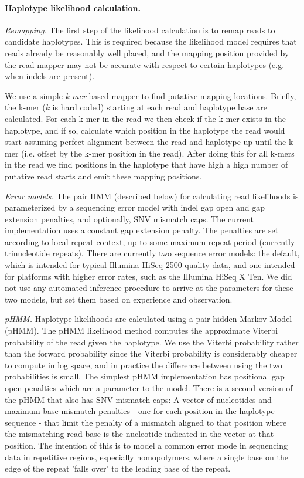 \documentclass[notitlepage, twocolumn, 10pt]{article}
\begin{document}
\paragraph*{Haplotype likelihood calculation.} \emph{Remapping.} The first step of the likelihood calculation is to remap reads to candidate haplotypes. This is required because the likelihood model requires that reads already be reasonably well placed, and the mapping position provided by the read mapper may not be accurate with respect to certain haplotypes (e.g. when indels are present).

We use a simple \emph{k-mer} based mapper to find putative mapping locations. Briefly, the k-mer ($k$ is hard coded) starting at each read and haplotype base are calculated. For each k-mer in the read we then check if the k-mer exists in the haplotype, and if so, calculate which position in the haplotype the read would start assuming perfect alignment between the read and haplotype up until the k-mer (i.e. offset by the k-mer position in the read). After doing this for all k-mers in the read we find positions in the haplotype that have high a high number of putative read starts and emit these mapping positions.

\vspace{3mm}
\noindent\emph{Error models.} The pair HMM (described below) for calculating
read likelihoods is parameterized by a sequencing error model with indel gap open and gap extension penalties, and optionally, SNV mismatch caps. The current implementation uses a constant gap extension penalty. The penalties are set according to local repeat context, up to some maximum repeat period (currently trinucleotide repeats). There are currently two sequence error models: the default, which is intended for typical Illumina HiSeq 2500 quality data, and one intended for platforms with higher error rates, such as the Illumina HiSeq X Ten. We did not use any automated inference procedure to arrive at the parameters for these two models, but set them based on experience and observation.

\vspace{3mm}
\noindent\emph{pHMM.} Haplotype likelihoods are calculated using a pair hidden Markov Model (pHMM). The pHMM likelihood method computes the approximate Viterbi probability of the read given the haplotype. We use the Viterbi probability rather than the forward probability since the Viterbi probability is considerably cheaper to compute in log space, and in practice the difference between using the two probabilities is small. The simplest pHMM implementation has positional gap open penalties which are a parameter to the model. There is a second version of the pHMM that also has SNV mismatch caps: A vector of nucleotides and maximum base mismatch penalties - one for each position in the haplotype sequence - that limit the penalty of a mismatch aligned to that position where the mismatching read base is the nucleotide indicated in the vector at that position. The intention of this is to model a common error mode in sequencing data in repetitive regions, especially homopolymers, where a single base on the edge of the repeat 'falls over' to the leading base of the repeat.
\end{document}
